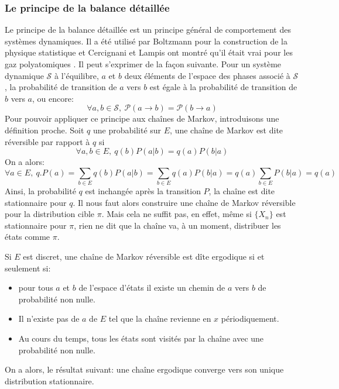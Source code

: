 \subsubsection{Le principe de la balance détaillée}

Le principe de la balance détaillée est un principe général de comportement des systèmes dynamiques. Il a été utilisé par Boltzmann pour la construction de la physique statistique et Cercignani et Lampis ont montré qu'il était vrai pour les gaz polyatomiques \cite{Cercignani81}. Il peut s'exprimer de la façon suivante. Pour un système dynamique $\mathcal{S}$ à l'équilibre, $a$ et $b$ deux éléments de l'espace des phases associé à $\mathcal{S}$, la probabilité de transition de $a$ vers $b$ est égale à la probabilité de transition de $b$ vers $a$, ou encore: 
\begin{equation}
\forall a,b \in \mathcal{S},\ \mathcal{P}(a \rightarrow b) = \mathcal{P}(b \rightarrow a) 
\end{equation}
Pour pouvoir appliquer ce principe aux chaînes de Markov, introduisons une définition proche. Soit $q$ une probabilité sur $E$, une chaîne de Markov est dite réversible par rapport à $q$ si
\begin{equation}
\forall a,b \in E,\ q(b)P(a|b)=q(a)P(b|a)
\end{equation}
On a alors:
\begin{equation}
\forall a \in E,\ q.P (a) = \sum_{b \in E} q(b)P(a|b) = \sum_{b \in E} q(a)P(b|a) = q(a) \sum_{b \in E}P(b|a) = q(a)
\end{equation}
Ainsi, la probabilité $q$ est inchangée après la transition $P$, la chaîne est dite stationnaire pour $q$. Il nous faut alors construire une chaîne de Markov réversible pour la distribution cible $\pi$. Mais cela ne suffit pas, en effet, même si $\{X_n\}$ est stationnaire pour $\pi$, rien ne dit que la chaîne va, à un moment, distribuer les états comme $\pi$.

Si $E$ est discret, une chaîne de Markov réversible est dîte ergodique si et seulement si:
\begin{itemize}
\item pour tous $a$ et $b$ de l'espace d'états il existe un chemin de $a$  vers $b$  de probabilité non nulle. 
\item Il n'existe pas de $a$ de $E$ tel que la chaîne revienne en $x$ périodiquement.
\item  Au cours du temps, tous les états sont visités par la chaîne avec une probabilité non nulle. 
\end{itemize}
On a alors, le résultat suivant: une chaîne ergodique converge vers son unique distribution stationnaire.

